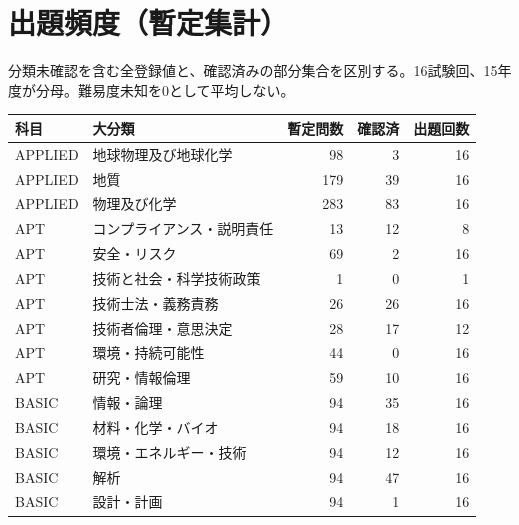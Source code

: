 \chapter{出題頻度（暫定集計）}
分類未確認を含む全登録値と、確認済みの部分集合を区別する。16試験回、15年度が分母。難易度未知を0として平均しない。
\begin{longtable}{p{.16\linewidth}p{.42\linewidth}rrr}
科目 & 大分類 & 暫定問数 & 確認済 & 出題回数\\\hline
APPLIED & 地球物理及び地球化学 & 98 & 3 & 16\\
APPLIED & 地質 & 179 & 39 & 16\\
APPLIED & 物理及び化学 & 283 & 83 & 16\\
APT & コンプライアンス・説明責任 & 13 & 12 & 8\\
APT & 安全・リスク & 69 & 2 & 16\\
APT & 技術と社会・科学技術政策 & 1 & 0 & 1\\
APT & 技術士法・義務責務 & 26 & 26 & 16\\
APT & 技術者倫理・意思決定 & 28 & 17 & 12\\
APT & 環境・持続可能性 & 44 & 0 & 16\\
APT & 研究・情報倫理 & 59 & 10 & 16\\
BASIC & 情報・論理 & 94 & 35 & 16\\
BASIC & 材料・化学・バイオ & 94 & 18 & 16\\
BASIC & 環境・エネルギー・技術 & 94 & 12 & 16\\
BASIC & 解析 & 94 & 47 & 16\\
BASIC & 設計・計画 & 94 & 1 & 16\\
\end{longtable}

